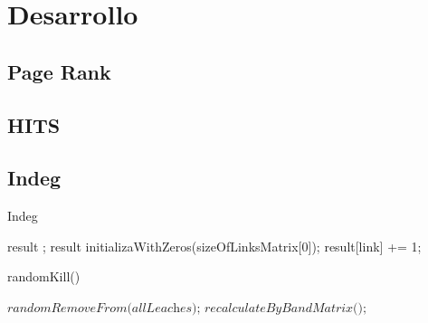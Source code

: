 \section{Desarrollo}

\subsection{Page Rank}

\subsection{HITS}

\subsection{Indeg}

\begin{algorithm}
\caption{Indeg}\label{euclid}
\begin{algorithmic}[1]
\STATE result \gets [];
\STATE result \gets initializaWithZeros(sizeOfLinksMatrix[0]);
	\STATE result[link] += 1;
\ENDFOR
\ENDFOR
\end{algorithmic}
\end{algorithm}

\begin{algorithm}
\caption{randomKill()}\label{euclid}
\begin{algorithmic}[1]
\State $\textit{randomRemoveFrom(allLeaches);}$ 
\State $\textit{recalculateByBandMatrix();}$
\end{algorithmic}
\end{algorithm}



